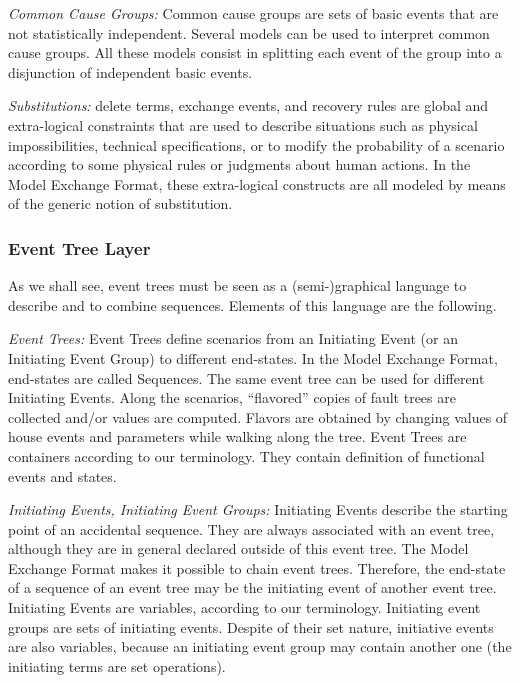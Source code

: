 \documentclass[11pt]{article}
\begin{document}
\emph{Common Cause Groups:} Common cause groups are sets of basic events that
are not statistically independent. Several models can be used to
interpret common cause groups. All these models consist in splitting
each event of the group into a disjunction of independent basic events.

\emph{Substitutions:} delete terms, exchange events, and recovery rules are
global and extra-logical constraints that are used to describe
situations such as physical impossibilities, technical specifications,
or to modify the probability of a scenario according to some physical
rules or judgments about human actions. In the Model Exchange Format,
these extra-logical constructs are all modeled by means of the generic
notion of substitution.

\subsubsection{Event Tree Layer}
\label{sec:orgb8be0e6}

As we shall see, event trees must be seen as a (semi-)graphical language
to describe and to combine sequences. Elements of this language are the
following.

\emph{Event Trees:} Event Trees define scenarios from an Initiating Event (or
an Initiating Event Group) to different end-states. In the Model
Exchange Format, end-states are called Sequences. The same event tree
can be used for different Initiating Events. Along the scenarios,
``flavored'' copies of fault trees are collected and/or values are
computed. Flavors are obtained by changing values of house events and
parameters while walking along the tree. Event Trees are containers
according to our terminology. They contain definition of functional
events and states.

\emph{Initiating Events, Initiating Event Groups:}  Initiating Events describe
the starting point of an accidental sequence. They are always associated
with an event tree, although they are in general declared outside of
this event tree. The Model Exchange Format makes it possible to chain
event trees. Therefore, the end-state of a sequence of an event tree may
be the initiating event of another event tree. Initiating Events are
variables, according to our terminology. Initiating event groups are
sets of initiating events. Despite of their set nature, initiative
events are also variables, because an initiating event group may contain
another one (the initiating terms are set operations).
\end{document}
